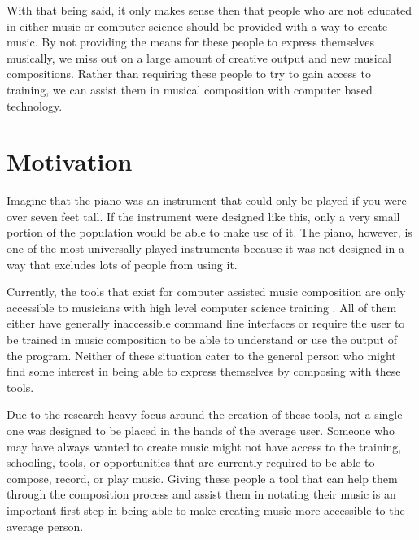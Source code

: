 \vspace{\baselineskip}

With that being said, it only makes sense then that people who are not educated in either music or computer science should be provided with a way to create music.  By not providing the means for these people to express themselves musically, we miss out on a large amount of creative output and new musical compositions.  Rather than requiring these people to try to gain access to training, we can assist them in musical composition with computer based technology.

\section{Motivation} 
\label{sec:motivation}

Imagine that the piano was an instrument that could only be played if you were over seven feet tall.  If the instrument were designed like this, only a very small portion of the population would be able to make use of it.  The piano, however, is one of the most universally played instruments because it was not designed in a way that excludes lots of people from using it.

\vspace{\baselineskip}

Currently, the tools that exist for computer assisted music composition are only accessible to musicians with high level computer science training \cite{Teymuri_2019}.  All of them either have generally inaccessible command line interfaces or require the user to be trained in music composition to be able to understand or use the output of the program.  Neither of these situation cater to the general person who might find some interest in being able to express themselves by composing with these tools.

\vspace{\baselineskip}

Due to the research heavy focus around the creation of these tools, not a single one was designed to be placed in the hands of the average user.  Someone who may have always wanted to create music might not have access to the training, schooling, tools, or opportunities that are currently required to be able to compose, record, or play music.  Giving these people a tool that can help them through the composition process and assist them in notating their music is an important first step in being able to make creating music more accessible to the average person.


